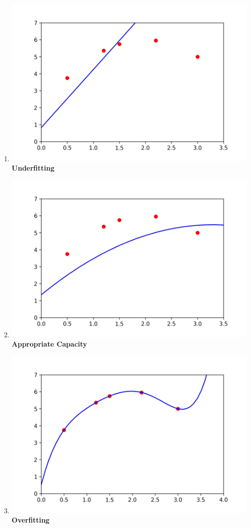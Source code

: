 \documentclass[12pt,aspectratio=169]{beamer}
\begin{document}
\begin{frame}
\begin{enumerate}
\item \includegraphics[scale=0.2]{Linear} \textbf{Underfitting}\pause
\item \includegraphics[scale=0.2]{Quadratic3} \textbf{Appropriate Capacity}\pause
\item \includegraphics[scale=0.2]{Quadratic4} \textbf{Overfitting}
\end{enumerate}
\end{frame}
\end{document}

